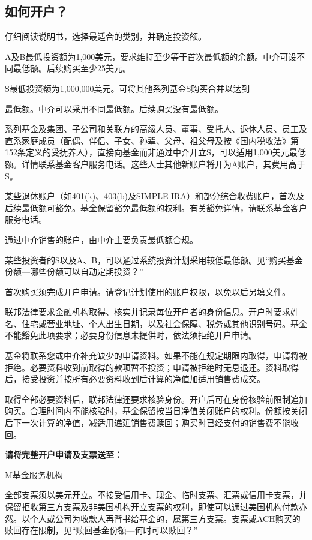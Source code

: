 \documentclass[UTF8,fontset=none,11pt,a4paper]{ctexart}
\begin{document}
\subsection*{如何开户？}
仔细阅读说明书，选择最适合的类别，并确\allowbreak\mbox{定投资额。}

A及B最低投资额为1,000美元，要求维持至少等于首次最低额的余额。中介可设不同最低额。后续购买至少25美元。

S最低投资额为1,000,000美元。可将其他系列基金S购买合\allowbreak\mbox{并以达到}


\par{}\label{originalpage11}
最低额。中介可以采用不同最低额。后续购买没\allowbreak\mbox{有最低额。}

系列基金及集团、子公司和关联方的高级人员、董事、受托人、退休人员、员工及直系家庭成员（配偶、伴侣、子女、孙辈、父母、祖父母及按《国内税收法》第152条定义的受抚养人），直接向基金而非通过中介开立S，可以适用1,000美元最低额。详情联系基金客户服务电话。这些人士其他新账户将开为A账户，其费用高于S。

某些退休账户（如401(k)、403(b)及SIMPLE IRA）和部分综合收费账户，首次及后续最低额可豁免。基金保留豁免最低额的权利。有关豁免详情，请联系基金客户服\allowbreak\mbox{务电话。}

通过中介销售的账户，由中介主要负责最\allowbreak\mbox{低额合规。}

某些投资者的S以及A、B，可以通过系统投资计划采用较低最低额。见“购买基金份额—哪些份额可以自动\allowbreak\mbox{定期投资？”}

首次购买须完成开户申请。请登记计划使用的账户权限，以免以后\allowbreak\mbox{另填文件。}

联邦法律要求金融机构取得、核实并记录每位开户者的身份信息。开户时要求姓名、住宅或营业地址、个人出生日期，以及社会保障、税务或其他识别号码。基金不能豁免此项要求；必要身份信息未提供时，依法须拒绝\allowbreak\mbox{开户申请。}

基金将联系您或中介补充缺少的申请资料。如果不能在规定期限内取得，申请将被拒绝。必要资料收到前取得的款项暂不投资；申请被拒绝时无息退还。资料取得后，接受投资并按所有必要资料收到后计算的净值加适用销\allowbreak\mbox{售费成交。}

取得全部必要资料后，联邦法律还要求核验身份。开户后可在身份核验前限制追加购买。合理时间内不能核验时，基金保留按当日净值关闭账户的权利。份额按关闭后下一次计算的净值，减适用递延销售费赎回；购买时已经支付的销售费\allowbreak\mbox{不能收回。}

\textbf{请将完整开户申请及支票送至：}

\noindent M基金\allowbreak\mbox{服务机构}\par\smallskip
全部支票须以美元开立。不接受信用卡、现金、临时支票、汇票或信用卡支票，并保留拒收第三方支票及非美国机构开立支票的权利，即使可以通过美国机构付款亦然。以个人或公司为收款人再背书给基金的，属第三方支票。支票或ACH购买的赎回存在限制，见“赎回基金份额—何时\allowbreak\mbox{可以赎回？”}
\end{document}
